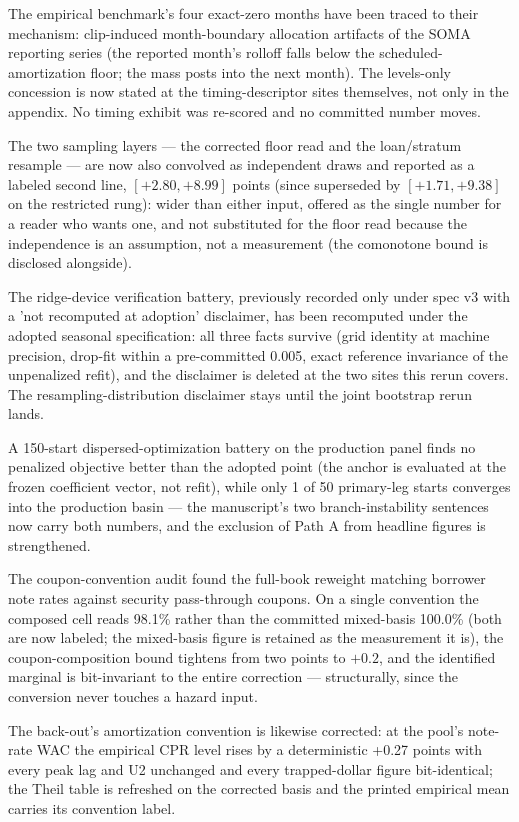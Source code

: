 \documentclass[11pt]{article}
\begin{document}
The empirical benchmark's four exact-zero months have been traced to their
mechanism: clip-induced month-boundary allocation artifacts of the SOMA reporting
series (the reported month's rolloff falls below the scheduled-amortization floor;
the mass posts into the next month). The levels-only concession is now stated at
the timing-descriptor sites themselves, not only in the appendix. No timing
exhibit was re-scored and no committed number moves.

The two sampling layers --- the corrected floor read and the loan/stratum
resample --- are now also convolved as independent draws and reported as a
labeled second line, $[+2.80, +8.99]$ points (since superseded by $[+1.71, +9.38]$ on the restricted rung): wider than either input, offered
as the single number for a reader who wants one, and not substituted for the
floor read because the independence is an assumption, not a measurement (the
comonotone bound is disclosed alongside).

The ridge-device verification battery, previously recorded only under spec v3
with a 'not recomputed at adoption' disclaimer, has been recomputed under the
adopted seasonal specification: all three facts survive (grid identity at
machine precision, drop-fit within a pre-committed 0.005, exact reference
invariance of the unpenalized refit), and the disclaimer is deleted at the two
sites this rerun covers. The resampling-distribution disclaimer stays until the
joint bootstrap rerun lands.

A 150-start dispersed-optimization battery on the production panel finds no
penalized objective better than the adopted point (the anchor is evaluated at
the frozen coefficient vector, not refit), while only 1 of 50 primary-leg
starts converges into the production basin --- the manuscript's two
branch-instability sentences now carry both numbers, and the exclusion of
Path A from headline figures is strengthened.

The coupon-convention audit found the full-book reweight matching borrower note
rates against security pass-through coupons. On a single convention the composed
cell reads 98.1\% rather than the committed mixed-basis 100.0\% (both are now
labeled; the mixed-basis figure is retained as the measurement it is), the
coupon-composition bound tightens from two points to $+0.2$, and the identified
marginal is bit-invariant to the entire correction --- structurally, since the
conversion never touches a hazard input.

The back-out's amortization convention is likewise corrected: at the pool's
note-rate WAC the empirical CPR level rises by a deterministic +0.27 points with
every peak lag and U2 unchanged and every trapped-dollar figure bit-identical;
the Theil table is refreshed on the corrected basis and the printed empirical
mean carries its convention label.
\end{document}
